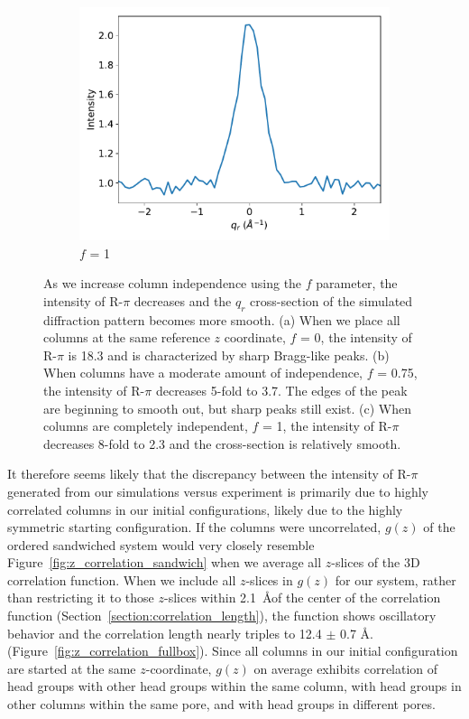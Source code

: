 \documentclass[journal=jpcbfk,manuscript=article]{achemso}
\begin{document}
\begin{figure}
  \begin{subfigure}{0.3\textwidth}
  \includegraphics[width=\textwidth]{sf_qy_sr100.pdf}
  \caption{$f$ = 1}\label{fig:sf_qy_sr100}
  \end{subfigure}
  \caption{As we increase column independence using the $f$ parameter, the
	  intensity of R-$\pi$ decreases and the $q_r$ cross-section of the simulated
	  diffraction pattern becomes more smooth.  (a) When we place all columns at the
	  same reference $z$ coordinate, $f$ = 0, the intensity of R-$\pi$ is 18.3 and is
	  characterized by sharp Bragg-like peaks. (b) When columns have a moderate
	  amount of independence, $f$ = 0.75, the intensity of R-$\pi$ decreases 5-fold
	  to 3.7. The edges of the peak are beginning to smooth out, but sharp peaks
	  still exist. (c) When columns are completely independent, $f$ = 1, the
	  intensity of R-$\pi$ decreases 8-fold to 2.3 and the cross-section is
          relatively smooth.}\label{fig:column_displacement}
  \end{figure}

  It therefore seems likely that the discrepancy between the intensity of
  R-$\pi$ generated from our simulations versus experiment is primarily due to
  highly correlated columns in our initial configurations, likely due to the
  highly symmetric starting configuration. If the columns were uncorrelated,
  $g(z)$ of the ordered sandwiched system would very closely resemble
  Figure~\ref{fig:z_correlation_sandwich} when we average all $z$-slices of the
  3D correlation function. When we include all $z$-slices in $g(z)$ for our
  system, rather than restricting it to those $z$-slices within 2.1~\AA of the
  center of the correlation function (Section~\ref{section:correlation_length}),
  the function shows oscillatory behavior and the correlation length
  nearly triples to 12.4 $\pm$ 0.7 \AA. (Figure~\ref{fig:z_correlation_fullbox}).
  Since all columns in our initial configuration are started at the same
  $z$-coordinate, $g(z)$ on average exhibits correlation of head groups with
  other head groups within the same column, with head groups in other columns
  within the same pore, and with head groups in different pores.
\end{document}
